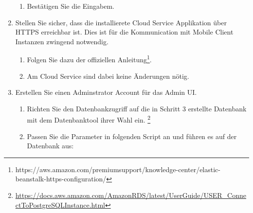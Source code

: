 \begin{enumerate}
\begin{enumerate}
        \item Bestätigen Sie die Eingabem.
    \end{enumerate}
    \item Stellen Sie sicher, dass die installierete Cloud Service Applikation über HTTPS erreichbar ist. Dies ist für die Kommunication mit Mobile Client Instanzen zwingend notwendig.
    \begin{enumerate}
        \item Folgen Sie dazu der offiziellen Anleitung\footnote{https://aws.amazon.com/premiumsupport/knowledge-center/elastic-beanstalk-https-configuration/}.
        \item Am Cloud Service sind dabei keine Änderungen nötig. 
    \end{enumerate}
    \item Erstellen Sie einen Adminstrator Account für das Admin UI.
    \begin{enumerate}
        \item Richten Sie den Datenbankzugriff auf die in Schritt 3 erstellte Datenbank mit dem Datenbanktool ihrer Wahl ein.
        \footnote{\url{https://docs.aws.amazon.com/AmazonRDS/latest/UserGuide/USER_ConnectToPostgreSQLInstance.html}}
        \item Passen Sie die Parameter in folgenden Script an und führen es auf der Datenbank aus:
        

    \end{enumerate}

\end{enumerate}


\clearpage
